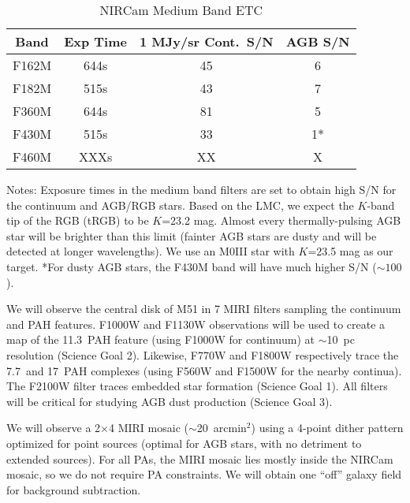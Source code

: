 \documentclass[12pt]{article}
\begin{document}
\begin{wraptable}[16]{R}{3.8in}
\vspace{-0.3in}
\small
\caption{NIRCam Medium Band ETC}\label{tab:medium}
\vspace{-0.4in}
\begin{center}
\begin{tabular}{|c|c|c|c|}
\hline
Band & Exp Time & 1 MJy/sr Cont.\ S/N & AGB S/N \\
\hline
F162M & 644s & 45 & 6 \\
\hline
F182M & 515s & 43 & 7 \\
 \hline
F360M & 644s & 81 & 5 \\
 \hline
F430M & 515s & 33 & 1* \\
 \hline 
F460M & XXXs & XX & X \\
 \hline 
\end{tabular}
\end{center}
\vspace{-0.1in}
Notes: Exposure times in the medium band filters are set to obtain high S/N for the continuum and AGB/RGB stars.  Based on the LMC, we expect the $K$-band tip of the RGB (tRGB) to be $K$=23.2 mag.  Almost every thermally-pulsing AGB star will be brighter than this limit (fainter AGB stars are dusty and will be detected at longer wavelengths).  We use an M0III star with $K$=23.5 mag as our target. *For dusty AGB stars, the F430M band will have much higher S/N ($\sim100$).
\end{wraptable}%

\vspace{0.25in}
  We will observe the central disk of M51 in 7 MIRI filters sampling the continuum and PAH features.  F1000W and F1130W observations will be used to create a map of the 11.3\micron\ PAH feature (using F1000W for continuum) at $\sim$10~pc resolution (Science Goal 2).  Likewise, F770W and F1800W respectively trace the 7.7\micron\ and 17\micron\ PAH complexes (using F560W and F1500W for the nearby continua).  The F2100W filter traces embedded star formation (Science Goal 1). All filters will be critical for studying AGB dust production (Science Goal 3).

We will observe a 2$\times$4 MIRI mosaic ($\sim$20~arcmin$^2$) using a 4-point dither pattern optimized for point sources 
(optimal for AGB stars, with no detriment to extended sources). 
For all PAs, the MIRI mosaic lies mostly inside the NIRCam mosaic, so we do not require PA constraints. We will obtain one ``off'' galaxy field for background subtraction. 
\end{document}
